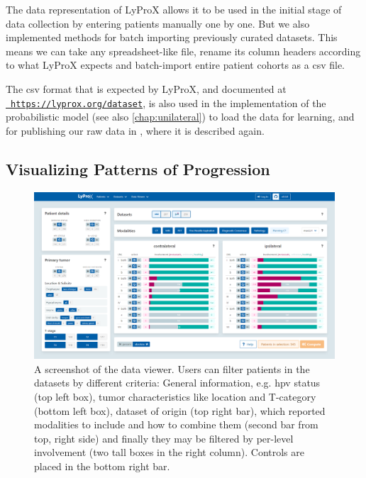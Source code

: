 \documentclass[\relativeRoot/main.tex]{subfiles}
\begin{document}
The data representation of LyProX allows it to be used in the initial stage of data collection by entering patients manually one by one. But we also implemented methods for batch importing previously curated datasets. This means we can take any spreadsheet-like file, rename its column headers according to what LyProX expects and batch-import entire patient cohorts as a \gls{csv} file.

The \gls{csv} format that is expected by LyProX, and documented at \href{https://lyprox.org/dataset}{~\texttt{https://lyprox.org/dataset}}, is also used in the implementation of the probabilistic  model (see also  \cref{chap:unilateral}) to load the data for learning, and for publishing our raw data in , where it is described again.

\subsection*{Visualizing Patterns of Progression}
\label{subsec:lyprox:implementation:viewer}

\begin{figure}
    \centering
    \includegraphics[width=1.0\textwidth, frame]{figures/data_viewer.png}
    \caption[
        Screenshot of the data viewer dashboard
    ]{
        A screenshot of the data viewer. Users can filter patients in the datasets by different criteria: General information, e.g. \gls{hpv} status (top left box), tumor characteristics like location and T-category (bottom left box), dataset of origin (top right bar), which reported modalities to include and how to combine them (second bar from top, right side) and finally they may be filtered by per-level involvement (two tall boxes in the right column). Controls are placed in the bottom right bar.
    }
    \label{fig:lyprox:data_viewer}
\end{figure}
\end{document}
